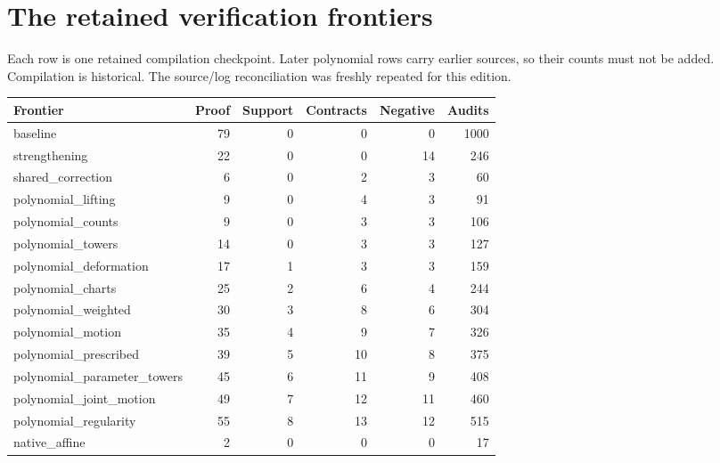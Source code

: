 \section{The retained verification frontiers}\label{sec:frontiers}
Each row is one retained compilation checkpoint. Later polynomial rows carry earlier sources, so their counts must not be added. Compilation is historical. The source/log reconciliation was freshly repeated for this edition.
\begin{longtable}{p{.36\linewidth}rrrrr}
\toprule Frontier & Proof & Support & Contracts & Negative & Audits\\\midrule\endhead
baseline & 79 & 0 & 0 & 0 & 1000\\
strengthening & 22 & 0 & 0 & 14 & 246\\
shared\_correction & 6 & 0 & 2 & 3 & 60\\
polynomial\_lifting & 9 & 0 & 4 & 3 & 91\\
polynomial\_counts & 9 & 0 & 3 & 3 & 106\\
polynomial\_towers & 14 & 0 & 3 & 3 & 127\\
polynomial\_deformation & 17 & 1 & 3 & 3 & 159\\
polynomial\_charts & 25 & 2 & 6 & 4 & 244\\
polynomial\_weighted & 30 & 3 & 8 & 6 & 304\\
polynomial\_motion & 35 & 4 & 9 & 7 & 326\\
polynomial\_prescribed & 39 & 5 & 10 & 8 & 375\\
polynomial\_parameter\_towers & 45 & 6 & 11 & 9 & 408\\
polynomial\_joint\_motion & 49 & 7 & 12 & 11 & 460\\
polynomial\_regularity & 55 & 8 & 13 & 12 & 515\\
native\_affine & 2 & 0 & 0 & 0 & 17\\
\bottomrule\end{longtable}
